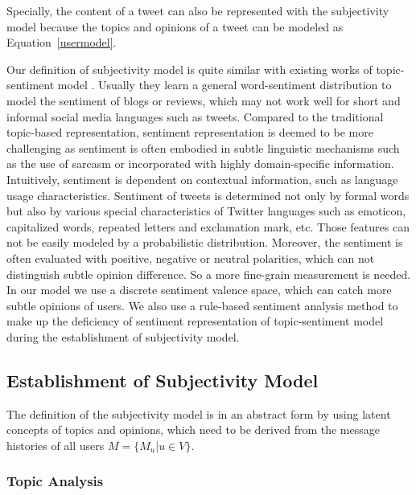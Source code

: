 \documentclass{acm_proc_article-sp}
\begin{document}
Specially, the content of a tweet can also be represented with the subjectivity model because the topics and opinions of a tweet can be modeled as Equation~\ref{usermodel}. 

Our definition of subjectivity model is quite similar with existing works of topic-sentiment model \cite{mei2007topic,lin2009joint,zhao2012user}. Usually they learn a general word-sentiment distribution to model the sentiment of blogs or reviews, which may not work well for short and informal social media languages such as tweets. Compared to the traditional topic-based representation, sentiment representation is deemed to be more challenging as sentiment is often embodied in subtle linguistic mechanisms such as the use of sarcasm or incorporated with highly domain-specific information. Intuitively, sentiment is dependent on contextual information, such as language usage characteristics. Sentiment of tweets is determined not only by formal words but also by various special characteristics of Twitter languages such as emoticon, capitalized words, repeated letters and exclamation mark, etc. Those features can not be easily modeled by a probabilistic distribution. Moreover, the sentiment is often evaluated with positive, negative or neutral polarities, which can not distinguish subtle opinion difference. So a more fine-grain measurement is needed. In our model we use a discrete sentiment valence space, which can catch more subtle opinions of users. We also use a rule-based sentiment analysis method to make up the deficiency of sentiment representation of topic-sentiment model during the establishment of subjectivity model.

\subsection{Establishment of Subjectivity Model}
\label{establishment}

The definition of the subjectivity model is in an abstract form by using latent concepts of topics and opinions,  which need to be derived from the message histories of all users $ M=\lbrace M_{u}\vert u \in V\rbrace$.

\subsubsection{Topic Analysis}
\label{topic}
\end{document}
